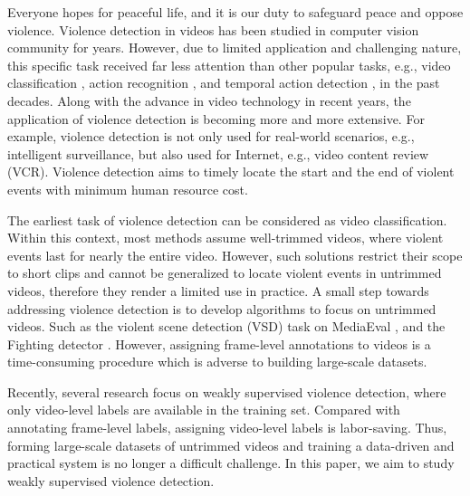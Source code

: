 \documentclass[runningheads]{llncs}
\begin{document}
Everyone hopes for peaceful life, and it is our duty to safeguard peace and oppose violence. Violence detection \cite{nievas2011violence,hassner2012violent,demarty2015vsd,mohammadi2016angry,sudhakaran2017learning,sultani2018real,hanson2018bidirectional,perez2019detection} in videos has been studied in computer vision community for years. However, due to limited application and challenging nature, this specific task received far less attention than other popular tasks, e.g., video classification \cite{wu2019long}, action recognition \cite{girdhar2019video}, and temporal action detection \cite{gu2018ava}, in the past decades. Along with the advance in video technology in recent years, the application of violence detection is becoming more and more extensive. For example, violence detection is not only used for real-world scenarios, e.g., intelligent surveillance, but also used for Internet, e.g., video content review (VCR). Violence detection aims to timely locate the start and the end of violent events with minimum human resource cost.

The earliest task of violence detection \cite{nievas2011violence,hassner2012violent} can be considered as video classification. Within this context, most methods assume well-trimmed videos, where violent events last for nearly the entire video. However, such solutions restrict their scope to short clips and cannot be generalized to locate violent events in untrimmed videos, therefore they render a limited use in practice. A small step towards addressing violence detection is to develop algorithms to focus on untrimmed videos. Such as the violent scene detection (VSD) task on MediaEval \cite{demarty2015vsd}, and the Fighting detector \cite{perez2019detection}. However, assigning frame-level annotations to videos is a time-consuming procedure which is adverse to building large-scale datasets.

Recently, several research \cite{sultani2018real,zhong2019graph} focus on weakly supervised violence detection, where only video-level labels are available in the training set. Compared with annotating frame-level labels, assigning video-level labels is labor-saving. Thus, forming large-scale datasets of untrimmed videos and training a data-driven and practical system is no longer a difficult challenge. In this paper, we aim to study weakly supervised violence detection.
\end{document}
